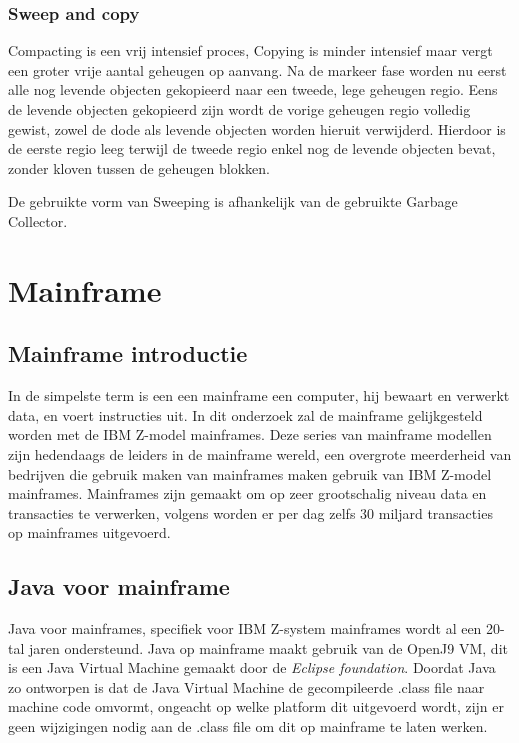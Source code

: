 \subsubsection{Sweep and copy}
Compacting is een vrij intensief proces, Copying is minder intensief maar vergt een groter vrije aantal geheugen op aanvang.
Na de markeer fase worden nu eerst alle nog levende objecten gekopieerd naar een tweede, lege geheugen regio.
Eens de levende objecten gekopieerd zijn wordt de vorige geheugen regio volledig gewist, zowel de dode als levende objecten worden hieruit verwijderd.
Hierdoor is de eerste regio leeg terwijl de tweede regio enkel nog de levende objecten bevat, zonder kloven tussen de geheugen blokken.

De gebruikte vorm van Sweeping is afhankelijk van de gebruikte Garbage Collector.
\autocite{Putten2022}


\section{Mainframe}
\label{sec:mainframe}
\subsection{Mainframe introductie}
\label{sec:mainframe introductie}

In de simpelste term is een een mainframe een computer, hij bewaart en verwerkt data, en voert instructies uit.
In dit onderzoek zal de mainframe gelijkgesteld worden met de IBM Z-model mainframes.
Deze series van mainframe modellen zijn hedendaags de leiders in de mainframe wereld, een overgrote meerderheid van bedrijven die gebruik maken van mainframes maken gebruik van IBM Z-model mainframes.
Mainframes zijn gemaakt om op zeer grootschalig niveau data en transacties te verwerken, volgens \textcite{Critchley2021} worden er per dag zelfs 30 miljard transacties op mainframes uitgevoerd.



\subsection{Java voor mainframe}
\label{sec:mainframe java}
Java voor mainframes, specifiek voor IBM Z-system mainframes wordt al een 20-tal jaren ondersteund.
Java op mainframe maakt gebruik van de OpenJ9 VM, dit is een Java Virtual Machine gemaakt door de \textit{Eclipse foundation}.
Doordat Java zo ontworpen is dat de Java Virtual Machine de gecompileerde .class file naar machine code omvormt, ongeacht op welke platform dit uitgevoerd wordt, zijn er geen wijzigingen nodig aan de .class file om dit op mainframe te laten werken.


